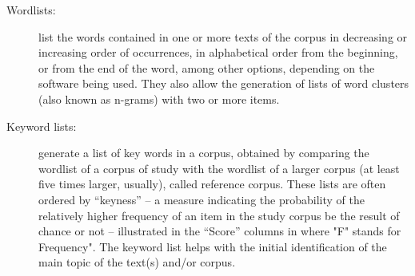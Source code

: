 \documentclass[english]{textolivre}
\begin{document}
\begin{description}
\item[Wordlists:] list the words contained in one or more texts of the corpus in decreasing or increasing order of occurrences, in alphabetical order from the beginning, or from the end of the word, among other options, depending on the software being used. They also allow the generation of lists of word clusters (also known as n-grams) with two or more items.

\item[Keyword lists:] generate a list of key words in a corpus, obtained by comparing the wordlist of a corpus of study with the wordlist of a larger corpus (at least five times larger, usually), called reference corpus. These lists are often ordered by “keyness” – a measure indicating the probability of the relatively higher frequency of an item in the study corpus be the result of chance or not – illustrated in the “Score” columns in  where "F" stands for Frequency". The keyword list helps with the initial identification of the main topic of the text(s) and/or corpus.




\end{description}
\end{document}
